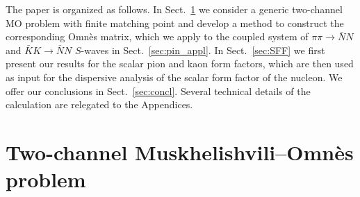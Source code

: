 \documentclass[11pt]{article}%
\begin{document}
The paper is organized as follows. In Sect.~\ref{sec:MOsol_finite_tm} we consider a generic two-channel MO problem with finite matching point and develop a method to construct the corresponding Omn\`es matrix, which we apply to the coupled system of $\pi\pi\to\bar N N$ and $\bar K K\to\bar N N$ $S$-waves in Sect.~\ref{sec:pin_appl}. In Sect.~\ref{sec:SFF} we first present our results for the scalar pion and kaon form factors, which are then used as input for the dispersive analysis of the scalar form factor of the nucleon. We offer our conclusions in Sect.~\ref{sec:concl}. Several technical details of the calculation are relegated to the Appendices.



\section{Two-channel Muskhelishvili--Omn\`es problem}
\label{sec:MOsol_finite_tm}
\end{document}
